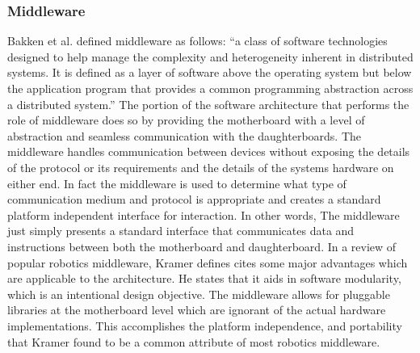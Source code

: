 	\subsubsection{Middleware} %
	\label{ssub:middleware}
	Bakken et al. \parencite{bakken2001middleware} defined middleware as follows: ``a class of software technologies designed to help manage the complexity and heterogeneity inherent in distributed systems. It is defined as a layer of software above the operating system but below the application program that provides a common programming abstraction across a distributed system.'' The portion of the \xten software architecture that performs the role of middleware does so by providing the motherboard with a level of abstraction and seamless communication with the daughterboards. The middleware handles communication between devices without exposing the details of the protocol or its requirements and the details of the systems hardware on either end. In fact the middleware is used to determine what type of communication medium and protocol is appropriate and creates a standard platform independent interface for interaction. In other words, The middleware just simply presents a standard interface that communicates data and instructions between both the motherboard and daughterboard.
	In a review of popular robotics middleware, Kramer \parencite{Kramer2006} defines cites some major advantages which are applicable to the \xten architecture. He states that it aids in software modularity, which is an intentional design objective. The middleware allows for pluggable libraries at the motherboard level which are ignorant of the actual hardware implementations. This accomplishes the platform independence, and portability that Kramer found to be a common attribute of most robotics middleware.
	
